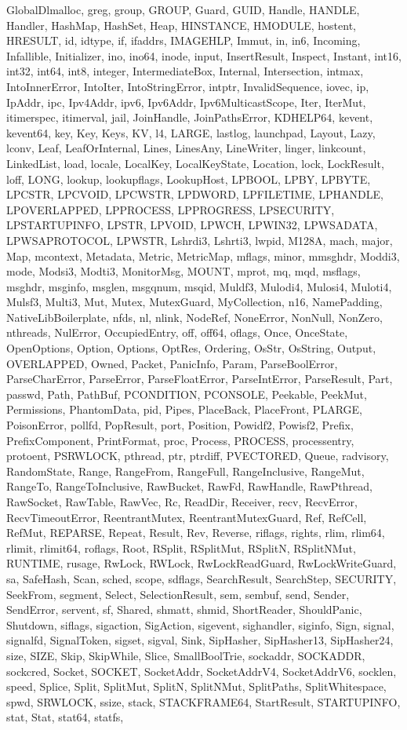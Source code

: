 {GlobalDlmalloc, greg, group, GROUP, Guard, GUID, Handle, HANDLE, Handler, HashMap, HashSet, Heap, HINSTANCE, HMODULE, hostent, HRESULT, id, idtype, if, ifaddrs, IMAGEHLP, Immut, in, in6, Incoming, Infallible, Initializer, ino, ino64, inode, input, InsertResult, Inspect, Instant, int16, int32, int64, int8, integer, IntermediateBox, Internal, Intersection, intmax, IntoInnerError, IntoIter, IntoStringError, intptr, InvalidSequence, iovec, ip, IpAddr, ipc, Ipv4Addr, ipv6, Ipv6Addr, Ipv6MulticastScope, Iter, IterMut, itimerspec, itimerval, jail, JoinHandle, JoinPathsError, KDHELP64, kevent, kevent64, key, Key, Keys, KV, l4, LARGE, lastlog, launchpad, Layout, Lazy, lconv, Leaf, LeafOrInternal, Lines, LinesAny, LineWriter, linger, linkcount, LinkedList, load, locale, LocalKey, LocalKeyState, Location, lock, LockResult, loff, LONG, lookup, lookupflags, LookupHost, LPBOOL, LPBY, LPBYTE, LPCSTR, LPCVOID, LPCWSTR, LPDWORD, LPFILETIME, LPHANDLE, LPOVERLAPPED, LPPROCESS, LPPROGRESS, LPSECURITY, LPSTARTUPINFO, LPSTR, LPVOID, LPWCH, LPWIN32, LPWSADATA, LPWSAPROTOCOL, LPWSTR, Lshrdi3, Lshrti3, lwpid, M128A, mach, major, Map, mcontext, Metadata, Metric, MetricMap, mflags, minor, mmsghdr, Moddi3, mode, Modsi3, Modti3, MonitorMsg, MOUNT, mprot, mq, mqd, msflags, msghdr, msginfo, msglen, msgqnum, msqid, Muldf3, Mulodi4, Mulosi4, Muloti4, Mulsf3, Multi3, Mut, Mutex, MutexGuard, MyCollection, n16, NamePadding, NativeLibBoilerplate, nfds, nl, nlink, NodeRef, NoneError, NonNull, NonZero, nthreads, NulError, OccupiedEntry, off, off64, oflags, Once, OnceState, OpenOptions, Option, Options, OptRes, Ordering, OsStr, OsString, Output, OVERLAPPED, Owned, Packet, PanicInfo, Param, ParseBoolError, ParseCharError, ParseError, ParseFloatError, ParseIntError, ParseResult, Part, passwd, Path, PathBuf, PCONDITION, PCONSOLE, Peekable, PeekMut, Permissions, PhantomData, pid, Pipes, PlaceBack, PlaceFront, PLARGE, PoisonError, pollfd, PopResult, port, Position, Powidf2, Powisf2, Prefix, PrefixComponent, PrintFormat, proc, Process, PROCESS, processentry, protoent, PSRWLOCK, pthread, ptr, ptrdiff, PVECTORED, Queue, radvisory, RandomState, Range, RangeFrom, RangeFull, RangeInclusive, RangeMut, RangeTo, RangeToInclusive, RawBucket, RawFd, RawHandle, RawPthread, RawSocket, RawTable, RawVec, Rc, ReadDir, Receiver, recv, RecvError, RecvTimeoutError, ReentrantMutex, ReentrantMutexGuard, Ref, RefCell, RefMut, REPARSE, Repeat, Result, Rev, Reverse, riflags, rights, rlim, rlim64, rlimit, rlimit64, roflags, Root, RSplit, RSplitMut, RSplitN, RSplitNMut, RUNTIME, rusage, RwLock, RWLock, RwLockReadGuard, RwLockWriteGuard, sa, SafeHash, Scan, sched, scope, sdflags, SearchResult, SearchStep, SECURITY, SeekFrom, segment, Select, SelectionResult, sem, sembuf, send, Sender, SendError, servent, sf, Shared, shmatt, shmid, ShortReader, ShouldPanic, Shutdown, siflags, sigaction, SigAction, sigevent, sighandler, siginfo, Sign, signal, signalfd, SignalToken, sigset, sigval, Sink, SipHasher, SipHasher13, SipHasher24, size, SIZE, Skip, SkipWhile, Slice, SmallBoolTrie, sockaddr, SOCKADDR, sockcred, Socket, SOCKET, SocketAddr, SocketAddrV4, SocketAddrV6, socklen, speed, Splice, Split, SplitMut, SplitN, SplitNMut, SplitPaths, SplitWhitespace, spwd, SRWLOCK, ssize, stack, STACKFRAME64, StartResult, STARTUPINFO, stat, Stat, stat64, statfs, }
